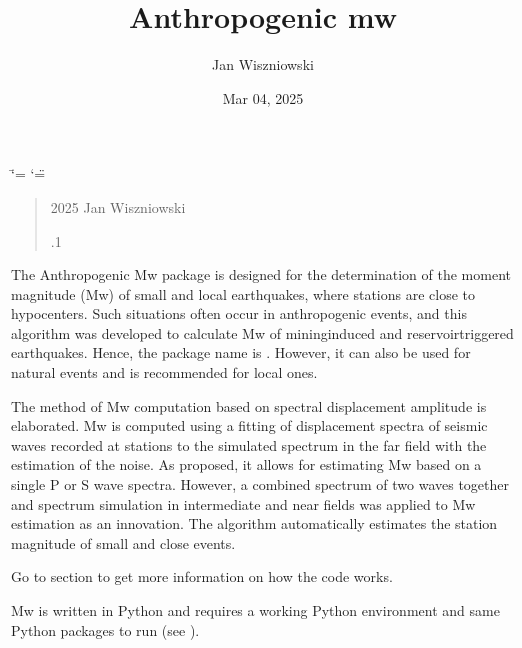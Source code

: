 \documentclass[letterpaper,10pt,english]{sphinxmanual}
\title{Anthropogenic mw}
\date{Mar 04, 2025}
\author{Jan Wiszniowski}
\begin{document}
\ifdefined\shorthandoff
  \ifnum\catcode`\=\string=\active\shorthandoff{=}\fi
  \ifnum\catcode`\"=\active{}\fi
\fi

\pagestyle{empty}
\sphinxmaketitle
\pagestyle{plain}
\sphinxtableofcontents
\pagestyle{normal}
\label{\detokenize{index::doc}}


\sphinxAtStartPar
{}
\begin{quote}\begin{description}
\sphinxhyphen{}2025 Jan Wiszniowski 

\sphinxAtStartPar


.1

\end{description}\end{quote}

\sphinxAtStartPar
The Anthropogenic Mw package is designed for the determination of the moment magnitude (Mw)
of small and local earthquakes, where stations are close to hypocenters.
Such situations often occur in anthropogenic events, and this algorithm was developed to calculate Mw
of mining\sphinxhyphen{}induced and reservoir\sphinxhyphen{}triggered earthquakes. Hence, the package name is .
However, it can also be used for natural events and is recommended for local ones.

\sphinxAtStartPar
The method of Mw computation based on spectral displacement amplitude is elaborated.
Mw is computed using a fitting of displacement spectra of seismic waves recorded at stations
to the simulated spectrum in the far field with the estimation of the noise.
As proposed, it allows for estimating Mw based on a single P or S wave spectra.
However, a combined spectrum of two waves together and spectrum simulation in intermediate and near fields
was applied to Mw estimation as an innovation.
The algorithm automatically estimates the station magnitude of small and close events.

\sphinxAtStartPar
Go to section {\hyperref[\detokenize{description:description}]{}}
to get more information on how the code works.

\sphinxAtStartPar
Mw is written in Python and requires a working Python
environment and same Python packages to run (see {\hyperref[\detokenize{installation:installation}]{}}).
\end{document}
